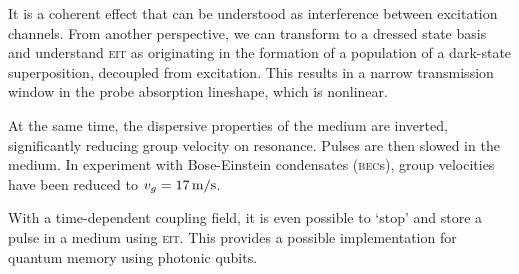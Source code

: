     It is a coherent effect that can be understood as interference between
    excitation channels. From another perspective, we can transform to a
    dressed state basis and understand \textsc{eit} as originating in the
    formation of a population of a dark-state superposition, decoupled from
    excitation. This results in a narrow transmission window in the probe
    absorption lineshape, which is nonlinear.

    At the same time, the dispersive properties of the medium are inverted,
    significantly reducing group velocity on resonance. Pulses are then slowed
    in the medium. In experiment with Bose-Einstein condensates (\textsc{bec}s),
    group velocities have been reduced to $v_g = \unit[17]{m/s}$.\cite{Hau1999}

    With a time-dependent coupling field, it is even possible to `stop' and
    store  a pulse in a medium using \textsc{eit}. This provides a possible
    implementation for quantum memory using photonic qubits.\cite{Lvovsky2009}

  

  